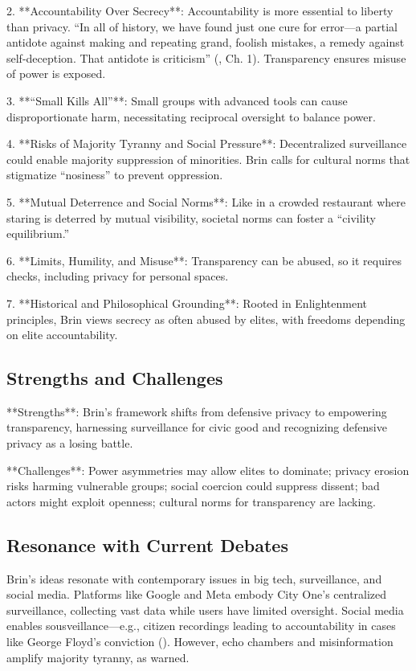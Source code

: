 \documentclass[12pt]{article}
\begin{document}
2. **Accountability Over Secrecy**: Accountability is more essential to liberty than privacy. ``In all of history, we have found just one cure for error—a partial antidote against making and repeating grand, foolish mistakes, a remedy against self-deception. That antidote is criticism'' (\citealp{Brin1998}, Ch. 1). Transparency ensures misuse of power is exposed.

3. **``Small Kills All''**: Small groups with advanced tools can cause disproportionate harm, necessitating reciprocal oversight to balance power.

4. **Risks of Majority Tyranny and Social Pressure**: Decentralized surveillance could enable majority suppression of minorities. Brin calls for cultural norms that stigmatize ``nosiness'' to prevent oppression.

5. **Mutual Deterrence and Social Norms**: Like in a crowded restaurant where staring is deterred by mutual visibility, societal norms can foster a ``civility equilibrium.''

6. **Limits, Humility, and Misuse**: Transparency can be abused, so it requires checks, including privacy for personal spaces.

7. **Historical and Philosophical Grounding**: Rooted in Enlightenment principles, Brin views secrecy as often abused by elites, with freedoms depending on elite accountability.

\subsection{Strengths and Challenges}

**Strengths**: Brin's framework shifts from defensive privacy to empowering transparency, harnessing surveillance for civic good and recognizing defensive privacy as a losing battle.

**Challenges**: Power asymmetries may allow elites to dominate; privacy erosion risks harming vulnerable groups; social coercion could suppress dissent; bad actors might exploit openness; cultural norms for transparency are lacking.

\subsection{Resonance with Current Debates}

Brin's ideas resonate with contemporary issues in big tech, surveillance, and social media. Platforms like Google and Meta embody City One's centralized surveillance, collecting vast data while users have limited oversight. Social media enables sousveillance—e.g., citizen recordings leading to accountability in cases like George Floyd's conviction (\citealp{post36}). However, echo chambers and misinformation amplify majority tyranny, as warned.
\end{document}
